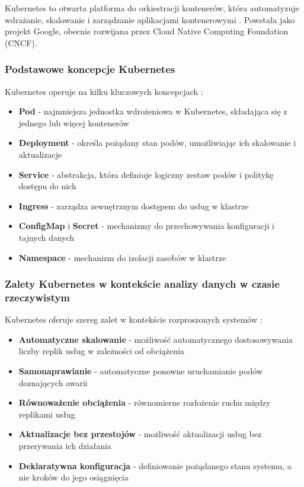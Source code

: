 Kubernetes to otwarta platforma do orkiestracji kontenerów, która automatyzuje wdrażanie, skalowanie i zarządzanie aplikacjami
kontenerowymi \citep{kubernetes}. Powstała jako projekt Google, obecnie rozwijana przez Cloud Native Computing Foundation (CNCF).

\subsubsection{Podstawowe koncepcje Kubernetes}
\label{subsubsec:podstawy_kubernetes}

Kubernetes operuje na kilku kluczowych koncepcjach \citep{kubernetes_concepts}:

\begin{itemize}
    \item \textbf{Pod} - najmniejsza jednostka wdrożeniowa w Kubernetes, składająca się z jednego lub więcej kontenerów
    \item \textbf{Deployment} - określa pożądany stan podów, umożliwiając ich skalowanie i aktualizacje
    \item \textbf{Service} - abstrakcja, która definiuje logiczny zestaw podów i politykę dostępu do nich
    \item \textbf{Ingress} - zarządza zewnętrznym dostępem do usług w klastrze
    \item \textbf{ConfigMap} i \textbf{Secret} - mechanizmy do przechowywania konfiguracji i tajnych danych
    \item \textbf{Namespace} - mechanizm do izolacji zasobów w klastrze
\end{itemize}

\subsubsection{Zalety Kubernetes w kontekście analizy danych w czasie rzeczywistym}
\label{subsubsec:zalety_kubernetes}

Kubernetes oferuje szereg zalet w kontekście rozproszonych systemów \citep{kubernetes_benefits}:

\begin{itemize}
    \item \textbf{Automatyczne skalowanie} - możliwość automatycznego dostosowywania liczby replik usług w zależności od obciążenia
    \item \textbf{Samonaprawianie} - automatyczne ponowne uruchamianie podów doznających awarii
    \item \textbf{Równoważenie obciążenia} - równomierne rozłożenie ruchu między replikami usług
    \item \textbf{Aktualizacje bez przestojów} - możliwość aktualizacji usług bez przerywania ich działania
    \item \textbf{Deklaratywna konfiguracja} - definiowanie pożądanego stanu systemu, a nie kroków do jego osiągnięcia
\end{itemize}


